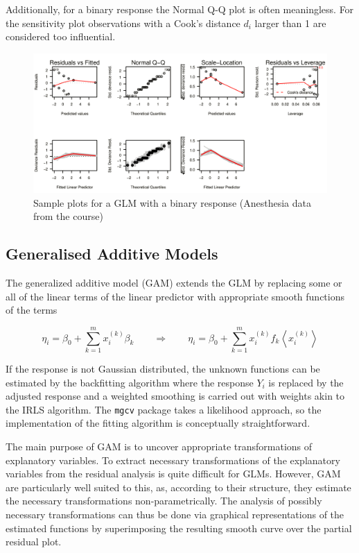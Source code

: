\documentclass[11pt]{article}
\begin{document}
Additionally, for a binary response the Normal Q-Q plot is often meaningless. For the sensitivity plot observations with a Cook's distance $d_i$ larger than 1 are considered too influential.

\begin{figure}[tbh]
	\centering
	\includegraphics[width=0.9\linewidth, keepaspectratio]{img/glm_diagnostic_plots}
	\caption{Sample plots for a GLM with a binary response (Anesthesia data from the course)}
	\label{fig:glmdiagnosticplots}
\end{figure}

\subsection{Generalised Additive Models}

The generalized additive model (GAM) extends the GLM by replacing some or all of the linear terms of the linear predictor with appropriate smooth functions of the terms

\begin{equation*}
	\eta_i = \beta_0 + \sum_{k=1}^{m} x_i^{(k)}\beta_k\qquad \Rightarrow \qquad \eta_i = \beta_0 + \sum_{k=1}^{m} x_i^{(k)} f_k \left\langle x_i^{(k)} \right\rangle
\end{equation*}

If the response is not Gaussian distributed, the unknown functions can be estimated by the backfitting algorithm where the response $Y_i$ is replaced by the adjusted response and a weighted smoothing is carried out with weights akin to the IRLS algorithm. The \texttt{mgcv} package takes a likelihood approach, so the implementation of the fitting algorithm is conceptually straightforward.

The main purpose of GAM is to uncover appropriate transformations of explanatory variables. To extract necessary transformations of the explanatory variables from the residual analysis is quite difficult for GLMs. However, GAM are particularly well suited to this, as, according to their structure, they estimate the necessary transformations non-parametrically. The analysis of possibly necessary transformations can thus be done via graphical representations of the estimated functions by superimposing the resulting smooth curve over the partial residual plot.
\end{document}
